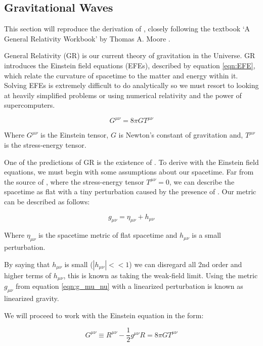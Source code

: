 \subsection{\label{sec:GWs}Gravitational Waves}

This section will reproduce the derivation of \gws, closely following the textbook `A General Relativity Workbook' by Thomas A. Moore \cite{moore_2013}.

General Relativity (GR) is our current theory of gravitation in the Universe. GR introduces the Einstein field equations (EFEs), described by equation \ref{eqn:EFE}, which relate the curvature of spacetime to the matter and energy
within it. Solving EFEs is extremely difficult to do analytically so we must resort to looking at heavily simplified problems or using numerical relativity and the power of supercomputers.

\begin{equation}
   G^{\mu \nu} = 8 \pi G T^{\mu \nu}
   \label{eqn:EFE}
\end{equation}

Where $G^{\mu \nu}$ is the Einstein tensor, $G$ is Newton's constant of gravitation and, $T^{\mu \nu}$ is the stress-energy tensor.

One of the predictions of GR is the existence of \gws. To derive \gws with the Einstein field equations, we must begin with some assumptions about our spacetime. Far from the source of \gws, where the stress-energy tensor
$T^{\mu \nu} = 0$, we can describe the spacetime as flat with a tiny perturbation caused by the presence of \gws. Our metric can be described as follows:

\begin{equation}
   g_{\mu \nu} = \eta_{\mu \nu} + h_{\mu \nu}
   \label{eqn:g_mu_nu}
\end{equation}

Where $\eta_{\mu \nu}$ is the spacetime metric of flat spacetime and $h_{\mu \nu}$ is a small perturbation.

By saying that $h_{\mu \nu}$ is small ($|h_{\mu \nu}| << 1$) we can disregard all 2nd order and higher terms of $h_{\mu \nu}$, this is known as taking the weak-field limit. Using the metric $g_{\mu \nu}$ from equation \ref{eqn:g_mu_nu} with a linearized perturbation is known as linearized gravity.

We will proceed to work with the Einstein equation in the form:

\begin{equation}
   G^{\mu \nu} \equiv R^{\mu \nu} - \frac{1}{2} g^{\mu \nu} R = 8 \pi G T^{\mu \nu}
   \label{eqn:EFE2}
\end{equation}

